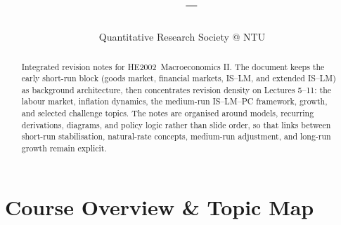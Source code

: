 \documentclass[12pt]{article}
\title{%
\vspace{-0.5cm}
{\Large\bfseries \CourseCode\ \CourseName{} -- \DocType}
}
\author{Quantitative Research Society @ NTU}
\date{\AcademicYear}
\newcommand{\CourseCode}{HE2002}
\newcommand{\CourseName}{Macroeconomics II}
\begin{document}
\maketitle
\thispagestyle{plainfirst}

\begin{abstract}
\noindent
Integrated revision notes for \CourseCode\ \CourseName. The document keeps the early short-run block (goods market, financial markets, IS--LM, and extended IS--LM) as background architecture, then concentrates revision density on Lectures 5--11: the labour market, inflation dynamics, the medium-run IS--LM--PC framework, growth, and selected challenge topics. The notes are organised around models, recurring derivations, diagrams, and policy logic rather than slide order, so that links between short-run stabilisation, natural-rate concepts, medium-run adjustment, and long-run growth remain explicit.
\end{abstract}

\vspace{0.5cm}
\newpage
\tableofcontents
\newpage

\fontsize{10.5pt}{11.5pt}\selectfont
\pagestyle{main}

\section*{Course Overview \& Topic Map}
\end{document}
